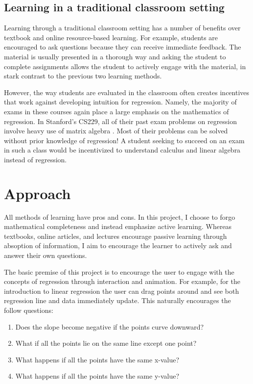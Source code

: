 \documentclass{acm_proc_article-sp}
\begin{document}
\subsection{Learning in a traditional classroom setting}

Learning through a traditional classroom setting has a number of benefits over
textbook and online resource-based learning. For example, students are
encouraged to ask questions because they can receive immediate feedback. The
material is usually presented in a thorough way and asking the student to
complete assignments allows the student to actively engage with the material,
in stark contrast to the previous two learning methods.

However, the way students are evaluated in the classroom often creates
incentives that work against developing intuition for regression. Namely, the
majority of exams in these courses again place a large emphasis on the
mathematics of regression. In Stanford's CS229, all of their past exam problems
on regression involve heavy use of matrix algebra \cite{CS229:online}.
Most of their problems can be solved without prior knowledge of regression! A
student seeking to succeed on an exam in such a class would be incentivized to
understand calculus and linear algebra instead of regression.

\section{Approach}

All methods of learning have pros and cons. In this project, I choose to forgo
mathematical completeness and instead emphasize active learning. Whereas
textbooks, online articles, and lectures encourage passive learning through
absoption of information, I aim to encourage the learner to actively ask and
answer their own questions.

The basic premise of this project is to encourage the user to engage with the
concepts of regression through interaction and animation. For example, for the
introduction to linear regression the user can drag points around and see both
regression line and data immediately update. This naturally encourages the
follow questions:

\begin{enumerate}
  \item Does the slope become negative if the points curve downward?
  \item What if all the points lie on the same line except one point?
  \item What happens if all the points have the same x-value?
  \item What happens if all the points have the same y-value?
\end{enumerate}
\end{document}
